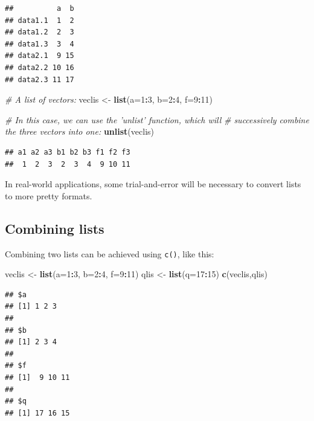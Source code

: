 \documentclass[]{book}
\newenvironment{Shaded}{\begin{snugshade}}{\end{snugshade}}
\newcommand{\CommentTok}[1]{\textcolor[rgb]{0.56,0.35,0.01}{\textit{#1}}}
\newcommand{\DataTypeTok}[1]{\textcolor[rgb]{0.13,0.29,0.53}{#1}}
\newcommand{\DecValTok}[1]{\textcolor[rgb]{0.00,0.00,0.81}{#1}}
\newcommand{\KeywordTok}[1]{\textcolor[rgb]{0.13,0.29,0.53}{\textbf{#1}}}
\newcommand{\NormalTok}[1]{#1}
\newcommand{\OperatorTok}[1]{\textcolor[rgb]{0.81,0.36,0.00}{\textbf{#1}}}
\newcommand{\StringTok}[1]{\textcolor[rgb]{0.31,0.60,0.02}{#1}}
\begin{document}
\begin{verbatim}
##          a  b
## data1.1  1  2
## data1.2  2  3
## data1.3  3  4
## data2.1  9 15
## data2.2 10 16
## data2.3 11 17
\end{verbatim}

\begin{Shaded}
\begin{Highlighting}[]
\CommentTok{# A list of vectors:}
\NormalTok{veclis <-}\StringTok{ }\KeywordTok{list}\NormalTok{(}\DataTypeTok{a=}\DecValTok{1}\OperatorTok{:}\DecValTok{3}\NormalTok{, }\DataTypeTok{b=}\DecValTok{2}\OperatorTok{:}\DecValTok{4}\NormalTok{, }\DataTypeTok{f=}\DecValTok{9}\OperatorTok{:}\DecValTok{11}\NormalTok{)}

\CommentTok{# In this case, we can use the 'unlist' function, which will }
\CommentTok{# successively combine the three vectors into one:}
\KeywordTok{unlist}\NormalTok{(veclis)}
\end{Highlighting}
\end{Shaded}

\begin{verbatim}
## a1 a2 a3 b1 b2 b3 f1 f2 f3 
##  1  2  3  2  3  4  9 10 11
\end{verbatim}

In real-world applications, some trial-and-error will be necessary to convert lists to more pretty formats.

\hypertarget{combining-lists}{%
\subsection{Combining lists}\label{combining-lists}}

Combining two lists can be achieved using \texttt{c()}, like this:

\begin{Shaded}
\begin{Highlighting}[]
\NormalTok{veclis <-}\StringTok{ }\KeywordTok{list}\NormalTok{(}\DataTypeTok{a=}\DecValTok{1}\OperatorTok{:}\DecValTok{3}\NormalTok{, }\DataTypeTok{b=}\DecValTok{2}\OperatorTok{:}\DecValTok{4}\NormalTok{, }\DataTypeTok{f=}\DecValTok{9}\OperatorTok{:}\DecValTok{11}\NormalTok{)}
\NormalTok{qlis <-}\StringTok{ }\KeywordTok{list}\NormalTok{(}\DataTypeTok{q=}\DecValTok{17}\OperatorTok{:}\DecValTok{15}\NormalTok{)}
\KeywordTok{c}\NormalTok{(veclis,qlis)}
\end{Highlighting}
\end{Shaded}

\begin{verbatim}
## $a
## [1] 1 2 3
## 
## $b
## [1] 2 3 4
## 
## $f
## [1]  9 10 11
## 
## $q
## [1] 17 16 15
\end{verbatim}
\end{document}
